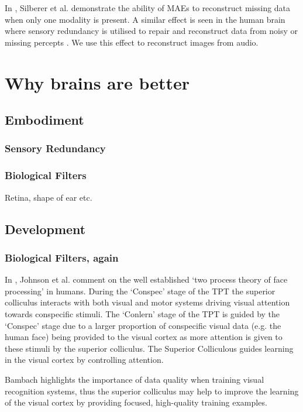 In \cite{silberer2014learning}, Silberer et al. demonstrate the ability of MAEs to reconstruct missing data when only one modality is present. A similar effect is seen in the human brain where sensory redundancy is utilised to repair and reconstruct data from noisy or missing percepts \cite{samuel1997lexical}. We use this effect to reconstruct images from audio. 

\section{Why brains are better}
\subsection{Embodiment}
\cite{pfeifer2006body, smith2005development}
\subsubsection{Sensory Redundancy}
\subsubsection{Biological Filters}
Retina, shape of ear etc.
\subsection{Development}
\subsubsection{Biological Filters, again}
In \cite{johnson2015two}, Johnson et al. comment on the well established `two process theory of face processing' in humans.  During the `Conspec' stage of the \ac{TPT} the superior colliculus interacts with both visual and motor systems driving visual attention towards conspecific stimuli. The `Conlern' stage of the \ac{TPT} is guided by the `Conspec' stage due to a larger proportion of conspecific visual data  (e.g. the human face) being provided to the visual cortex as more attention is given to these stimuli by the superior colliculus. 
The Superior Colliculous guides learning in the visual cortex by controlling attention.

Bambach \cite{bambach2017egocentric} highlights the importance of data quality when training visual recognition systems, thus the superior colliculus may help to improve the learning of the visual cortex by providing focused, high-quality training examples.

